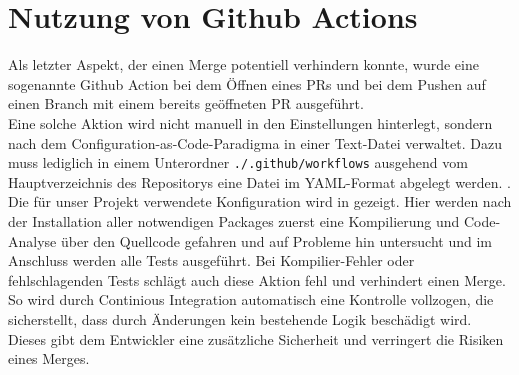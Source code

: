 \section{Nutzung von Github Actions}
\label{sec:github-actions}

Als letzter Aspekt, der einen Merge potentiell verhindern konnte, wurde eine sogenannte Github Action bei dem Öffnen
eines \ac{PR}s und bei dem Pushen auf einen Branch mit einem bereits geöffneten \ac{PR} ausgeführt. \\

Eine solche Aktion wird nicht manuell in den Einstellungen hinterlegt, sondern nach dem
Configuration-as-Code-Paradigma in einer Text-Datei verwaltet.
Dazu muss lediglich in einem Unterordner \texttt{./.github/workflows} ausgehend vom Hauptverzeichnis des Repositorys
eine Datei im YAML-Format abgelegt werden.  . \\

Die für unser Projekt verwendete Konfiguration wird in  gezeigt.
Hier werden nach der Installation aller notwendigen Packages zuerst eine Kompilierung und Code-Analyse über den
Quellcode gefahren und auf Probleme hin untersucht und im Anschluss werden alle Tests ausgeführt.
Bei Kompilier-Fehler oder fehlschlagenden Tests schlägt auch diese Aktion fehl und verhindert einen Merge. \\

So wird durch Continious Integration automatisch eine Kontrolle vollzogen, die sicherstellt, dass durch Änderungen
kein bestehende Logik beschädigt wird.
Dieses gibt dem Entwickler eine zusätzliche Sicherheit und verringert die Risiken eines Merges.